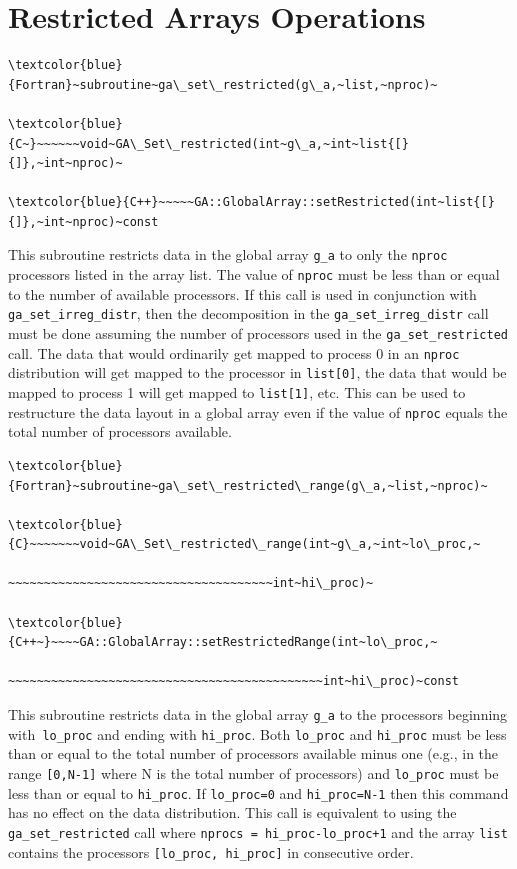 \section{Restricted Arrays Operations}
\begin{verbatim}
\textcolor{blue}{Fortran}~subroutine~ga\_set\_restricted(g\_a,~list,~nproc)~

\textcolor{blue}{C~}~~~~~~void~GA\_Set\_restricted(int~g\_a,~int~list{[}{]},~int~nproc)~

\textcolor{blue}{C++}~~~~~GA::GlobalArray::setRestricted(int~list{[}{]},~int~nproc)~const
\end{verbatim}
This subroutine restricts data in the global array \texttt{g\_a} to
only the \texttt{nproc} processors listed in the array list. The value
of \texttt{nproc} must be less than or equal to the number of available
processors. If this call is used in conjunction with \texttt{ga\_set\_irreg\_distr},
then the decomposition in the \texttt{ga\_set\_irreg\_distr} call
must be done assuming the number of processors used in the \texttt{ga\_set\_restricted}
call. The data that would ordinarily get mapped to process 0 in an
\texttt{nproc} distribution will get mapped to the processor in \texttt{list{[}0{]}},
the data that would be mapped to process 1 will get mapped to \texttt{list{[}1{]}},
etc. This can be used to restructure the data layout in a global array
even if the value of \texttt{nproc} equals the total number of processors
available. 
\begin{verbatim}
\textcolor{blue}{Fortran}~subroutine~ga\_set\_restricted\_range(g\_a,~list,~nproc)~

\textcolor{blue}{C}~~~~~~~void~GA\_Set\_restricted\_range(int~g\_a,~int~lo\_proc,~

~~~~~~~~~~~~~~~~~~~~~~~~~~~~~~~~~~~~~int~hi\_proc)~

\textcolor{blue}{C++~}~~~~GA::GlobalArray::setRestrictedRange(int~lo\_proc,~

~~~~~~~~~~~~~~~~~~~~~~~~~~~~~~~~~~~~~~~~~~~~int~hi\_proc)~const
\end{verbatim}
This subroutine restricts data in the global array \texttt{g\_a} to
the processors beginning with\texttt{ lo\_proc} and ending with \texttt{hi\_proc}.
Both \texttt{lo\_proc} and \texttt{hi\_proc} must be less than or
equal to the total number of processors available minus one (e.g.,
in the range \texttt{{[}0,N-1{]}} where N is the total number of processors)
and \texttt{lo\_proc} must be less than or equal to \texttt{hi\_proc}.
If \texttt{lo\_proc=0} and \texttt{hi\_proc=N-1} then this command
has no effect on the data distribution. This call is equivalent to
using the \texttt{ga\_set\_restricted} call where \texttt{nprocs =
hi\_proc-lo\_proc+1} and the array \texttt{list} contains the processors
\texttt{{[}lo\_proc, hi\_proc{]}} in consecutive order. 
